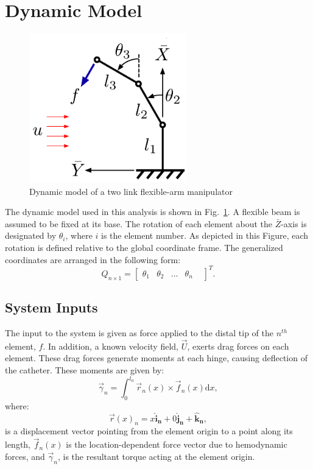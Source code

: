 \documentclass[letterpaper,10pt,conference]{ieeeconf}   %
\begin{document}
\section{Dynamic Model}
\label{sec:intro}
%
\begin{figure}[t!] 
\begin{center}
\includegraphics[width = 2.7in]{Figures/Planar_Model} 
\caption{Dynamic model of a two link flexible-arm manipulator} 
\label{fig:model}
\end{center}
\vspace{0.1in}
\end{figure}
%
The dynamic model used in this analysis is shown in Fig.~\ref{fig:model}. A flexible beam is assumed to be fixed at its base. The rotation of each element about the $\bar{Z}$-axis is designated by $\theta_{i}$, where $i$ is the element number. As depicted in this Figure, each rotation is defined relative to the global coordinate frame. The generalized coordinates are arranged in the following form:
%
\begin{equation}
\label{eq:nodaldisp}
Q_{n \times 1} = 
\begin{bmatrix}
 \theta_{1} & 
 \theta_{2} &
 \dots & 
 \theta_{n} & 
\end{bmatrix}^T.
\end{equation}
%

\subsection{System Inputs}
\label{sec:inputs}

The input to the system is given as force applied to the distal tip of the $n^{th}$ element, $f$. In addition, a known velocity field, $\vec{U}$, exerts drag forces on each element. These drag forces generate moments at each hinge, causing deflection of the catheter. These moments are given by:
%
\begin{equation}
\vec{\gamma}_{n} = \int_{0}^{l_n} \vec{r}_n(x) \times \vec{f}_n(x) \mathrm{d}x,
\end{equation}
%
where:
%
\begin{equation}
\label{eq:r_vector}
\vec{r}(x)_n = x \mathbf{\hat{i}_n} + 0 \mathbf{\hat{j}_n} + \mathbf{\hat{k}_n},
\end{equation}
%
is a displacement vector pointing from the element origin to a point along its length, $\vec{f}_n(x)$ is the location-dependent force vector due to hemodynamic forces, and $\vec{\gamma}_{n}$, is the resultant torque acting at the element origin. 
\end{document}
